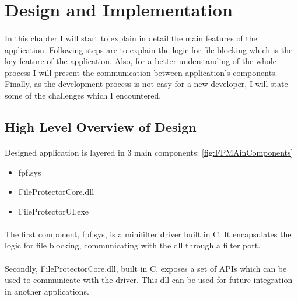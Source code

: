 	\newpage		
	\section{Design and Implementation}
		\paragraph{}
		In this chapter I will start to explain in detail the main features of the application. Following steps are to explain the logic for file blocking which is the key feature of the application. Also, for a better understanding of the whole process I will present the communication between application's components. Finally, as the development process is not easy for a new developer, I will state some of the challenges which I encountered.
	
		\subsection{High Level Overview of Design}
		\paragraph{}
		Designed application is layered in 3 main components: \ref{fig:FPMAinComponents}
		\begin{itemize}
			\item fpf.sys
			\item FileProtectorCore.dll
			\item FileProtectorUI.exe
		\end{itemize}
		
		\paragraph{}
		The first component, fpf.sys, is a minifilter driver built in C. It encapsulates the logic for file blocking, communicating with the dll through a filter port.
		
		\paragraph{}
		Secondly, FileProtectorCore.dll, built in C, exposes a set of APIs which can be used to communicate with the driver. This dll can be used for future integration in another applications.
		

